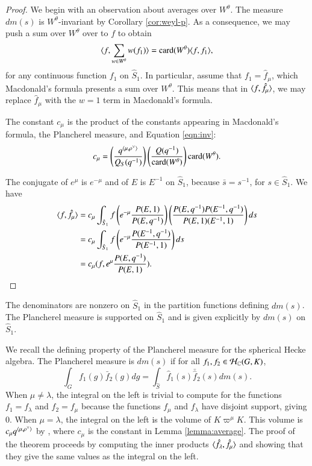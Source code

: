 \begin{proof}  
We begin with an observation about averages over $W^\theta$.
The  measure $dm(s)$ is $W^\theta$-invariant by Corollary \ref{cor:weyl-p}.  As a consequence,
we may push a sum over $W^\theta$ over to $f$ to obtain
\begin{equation}\label{eqn:inv}
\langle{f,\sum_{w\in W^\theta} w(f_1)}\rangle = {\operatorname{card}}(W^\theta)\langle{f,f_1}\rangle,
\end{equation}
for any continuous function $f_1$ on $\hat S_1$.
In particular, assume that $f_1=\hat f_\mu$, which Macdonald's
formula presents a sum over $W^\theta$.
This means that in $\langle{f,\hat f_\mu}\rangle$, we may replace 
$\hat f_\mu$  with
the $w=1$ term  in Macdonald's formula.

The constant $c_\mu$ is the product of the constants appearing in Macdonald's formula, the Plancherel measure,
and Equation \ref{eqn:inv}:
\[
c_\mu = \left(\frac{q^{\langle{\mu,\rho^\vee}\rangle}}{Q_S(q^{-1})}\right)\left(\frac{Q(q^{-1})}{{\operatorname{card}}(W^\theta)}\right) {\operatorname{card}}(W^\theta).
\]

The conjugate of $e^\mu$ is $e^{-\mu}$ and of $E$ is $E^{-1}$ on $\hat S_1$, because $\bar s = s^{-1}$, for $s\in \hat S_1$.
We have
\begin{align*}
\langle{f,\hat f_\mu}\rangle &=
c_\mu\int_{\hat S_1} f \left(e^{-\mu} \frac{P(E,1)}{P(E,q^{-1})}\right) \left(\frac{P(E,q^{-1}) P(E^{-1},q^{-1})}{P(E,1)(E^{-1},1)}\right) ds\\
&=
c_\mu\int_{\hat S_1} f \left(e^{-\mu} \frac{P(E^{-1},q^{-1})}{P(E^{-1},1)}\right) ds\\
&=
c_\mu (f, e^\mu\frac{ P(E,q^{-1})}{P(E,1)}).
\end{align*}
\end{proof}

\begin{theorem}
The denominators are nonzero on $\hat S_1$ in the partition functions defining 
$dm(s)$. 
The Plancherel measure is supported on $\hat S_1$ and is given explicitly by $dm(s)$ on $\hat S_1$.
\end{theorem}

\begin{remark}
We recall the defining property of the Plancherel measure
for the spherical Hecke algebra.  The Plancherel measure  is $dm(s)$  if
for all $f_1,f_2\in \mathcal H_{\mathbb{C}}(G,K)$,
\[
\int_G f_1(g) \bar f_2 (g) dg = \int_{\hat S} \hat f_1(s) \bar {\hat f}_2 (s) dm(s).
\]
When $\mu\ne\lambda$,
the integral on the left is trivial to compute for the functions $f_1 = f_\lambda$ and $f_2 = f_\mu$
because the functions $f_\mu$ and $f_\lambda$ have disjoint support, giving $0$.
When $\mu=\lambda$, the integral on the left is the volume of $K\varpi^\mu K$.
This volume is $c_\mu q^{\langle{\mu,\rho^\vee}\rangle}$ by \cite{casselman2005companion}, where $c_\mu$ is
the constant in Lemma \ref{lemma:average}.
The proof of the theorem proceeds by computing the inner products $\langle{\hat f_\lambda,\hat f_\mu}\rangle$
and showing that they give the same values as the integral on the left.
\end{remark}

